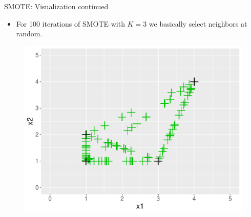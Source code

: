 \documentclass[11pt,compress,t,notes=noshow, xcolor=table]{beamer}
\begin{document}
		\begin{frame}{SMOTE: Visualization continued}
		\footnotesize
		
			\begin{itemize}
	
				\item For 100 iterations of SMOTE with $K=3$ we basically select neighbors at random.

			\end{itemize}		

			\begin{figure}
				\centering
				\includegraphics[width=0.8\linewidth]{figure_man/smote_viz_12.pdf}
			\end{figure}
		
	\end{frame}
		
\end{document}
